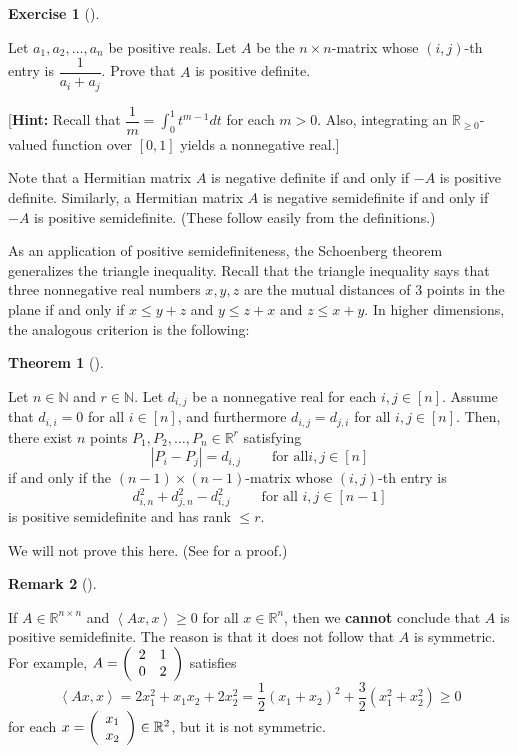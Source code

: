 \documentclass[numbers=enddot,12pt,final,onecolumn,notitlepage]{scrartcl}%
\newcounter{exer}
\numberwithin{exer}{subsection}
\theoremstyle{definition}
\newtheorem{theo}{Theorem}[subsection]
\newenvironment{theorem}[1][]
{\begin{theo}[#1]\begin{leftbar}}
{\end{leftbar}\end{theo}}
\newtheorem{remk}[theo]{Remark}
\newenvironment{remark}[1][]
{\begin{remk}[#1]\begin{leftbar}}
{\end{leftbar}\end{remk}}
\newtheorem{exmp}[exer]{Exercise}
\newenvironment{exercise}[1][]
{\begin{exmp}[#1]\begin{leftbar}}
{\end{leftbar}\end{exmp}}
\begin{document}
\begin{exercise}
 Let $a_{1},a_{2},\ldots,a_{n}$ be positive reals. Let $A$ be the
$n\times n$-matrix whose $\left(  i,j\right)  $-th entry is $\dfrac{1}%
{a_{i}+a_{j}}$. Prove that $A$ is positive definite. \medskip

[\textbf{Hint:} Recall that $\dfrac{1}{m}=\int_{0}^{1}t^{m-1}dt$ for each
$m>0$. Also, integrating an $\mathbb{R}_{\geq0}$-valued function over $\left[
0,1\right]  $ yields a nonnegative real.]
\end{exercise}

Note that a Hermitian matrix $A$ is negative definite if and only if $-A$ is
positive definite. Similarly, a Hermitian matrix $A$ is negative semidefinite
if and only if $-A$ is positive semidefinite. (These follow easily from the definitions.)

As an application of positive semidefiniteness, the Schoenberg theorem
generalizes the triangle inequality. Recall that the triangle inequality says
that three nonnegative real numbers $x,y,z$ are the mutual distances of $3$
points in the plane if and only if $x\leq y+z$ and $y\leq z+x$ and $z\leq
x+y$. In higher dimensions, the analogous criterion is the following:

\begin{theorem}
[Schoenberg's theorem]Let $n\in\mathbb{N}$ and $r\in\mathbb{N}$. Let $d_{i,j}$
be a nonnegative real for each $i,j\in\left[  n\right]  $. Assume that
$d_{i,i}=0$ for all $i\in\left[  n\right]  $, and furthermore $d_{i,j}%
=d_{j,i}$ for all $i,j\in\left[  n\right]  $. Then, there exist $n$ points
$P_{1},P_{2},\ldots,P_{n}\in\mathbb{R}^{r}$ satisfying%
\[
\left\vert P_{i}-P_{j}\right\vert =d_{i,j}\ \ \ \ \ \ \ \ \ \ \text{for all
}i,j\in\left[  n\right]
\]
if and only if the $\left(  n-1\right)  \times\left(  n-1\right)  $-matrix
whose $\left(  i,j\right)  $-th entry is
\[
d_{i,n}^{2}+d_{j,n}^{2}-d_{i,j}^{2}\ \ \ \ \ \ \ \ \ \ \text{for all }%
i,j\in\left[  n-1\right]
\]
is positive semidefinite and has rank $\leq r$.
\end{theorem}

We will not prove this here. (See \cite[Theorem 7.1]{LibLav15} for a proof.)

\begin{remark}
If $A\in\mathbb{R}^{n\times n}$ and $\left\langle Ax,x\right\rangle \geq0$ for
all $x\in\mathbb{R}^{n}$, then we \textbf{cannot} conclude that $A$ is
positive semidefinite. The reason is that it does not follow that $A$ is
symmetric. For example, $A=\left(
\begin{array}
[c]{cc}%
2 & 1\\
0 & 2
\end{array}
\right)  $ satisfies
\[
\left\langle Ax,x\right\rangle =2x_{1}^{2}+x_{1}x_{2}+2x_{2}^{2}=\dfrac{1}%
{2}\left(  x_{1}+x_{2}\right)  ^{2}+\dfrac{3}{2}\left(  x_{1}^{2}+x_{2}%
^{2}\right)  \geq0
\]
for each $x=\left(
\begin{array}
[c]{c}%
x_{1}\\
x_{2}%
\end{array}
\right)  \in\mathbb{R}^{2}$, but it is not symmetric.
\end{remark}
\end{document}
